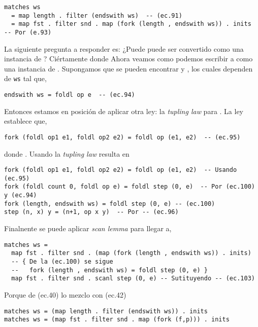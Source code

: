 \begin{verbatim}
matches ws
  = map length . filter (endswith ws)  -- (ec.91)
  = map fst . filter snd . map (fork (length , endswith ws)) . inits  -- Por (e.93)
\end{verbatim}

La siguiente pregunta a responder es: ¿Puede  puede ser convertido
como una instancia de ? Ciértamente  donde
Ahora veamos como podemos escribir a  como una instancia de .
Supongamos que se pueden encontrar  y , los cuales dependen de \texttt{ws} tal que,

\begin{verbatim}
endswith ws = foldl op e  -- (ec.94)
\end{verbatim}

Entonces estamos en posición de aplicar otra ley: la \textit{tupling law} para . La ley establece que,

\begin{verbatim}
fork (foldl op1 e1, foldl op2 e2) = foldl op (e1, e2)  -- (ec.95)
\end{verbatim}

donde . Usando la \textit{tupling law} resulta en

\begin{verbatim}
fork (foldl op1 e1, foldl op2 e2) = foldl op (e1, e2)  -- Usando (ec.95)
fork (foldl count 0, foldl op e) = foldl step (0, e)  -- Por (ec.100) y (ec.94)
fork (length, endswith ws) = foldl step (0, e) -- (ec.100)
step (n, x) y = (n+1, op x y)  -- Por -- (ec.96)
\end{verbatim}

Finalnente se puede aplicar \textit{scan lemma} para llegar a,
\begin{verbatim}
matches ws =
  map fst . filter snd . (map (fork (length , endswith ws)) . inits)
  -- { De la (ec.100) se sigue 
  --   fork (length , endswith ws) = foldl step (0, e) }
  map fst . filter snd . scanl step (0, e) -- Sutituyendo -- (ec.103)
\end{verbatim}

Porque de (ec.40) lo mezclo con (ec.42)
\begin{verbatim}
matches ws = (map length . filter (endswith ws)) . inits
matches ws = (map fst . filter snd . map (fork (f,p))) . inits
\end{verbatim}

